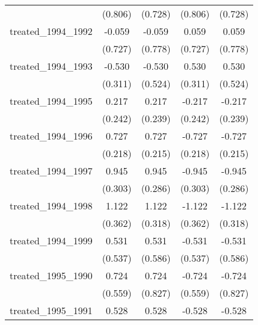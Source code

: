 {\begin{tabular}{l*{4}{c}}
            &     (0.806)         &     (0.728)         &     (0.806)         &     (0.728)         \\
[1em]
treated\_1994\_1992&      -0.059         &      -0.059         &       0.059         &       0.059         \\
            &     (0.727)         &     (0.778)         &     (0.727)         &     (0.778)         \\
[1em]
treated\_1994\_1993&      -0.530         &      -0.530         &       0.530         &       0.530         \\
            &     (0.311)         &     (0.524)         &     (0.311)         &     (0.524)         \\
[1em]
treated\_1994\_1995&       0.217         &       0.217         &      -0.217         &      -0.217         \\
            &     (0.242)         &     (0.239)         &     (0.242)         &     (0.239)         \\
[1em]
treated\_1994\_1996&       0.727\sym{***}&       0.727\sym{***}&      -0.727\sym{***}&      -0.727\sym{***}\\
            &     (0.218)         &     (0.215)         &     (0.218)         &     (0.215)         \\
[1em]
treated\_1994\_1997&       0.945\sym{**} &       0.945\sym{***}&      -0.945\sym{**} &      -0.945\sym{***}\\
            &     (0.303)         &     (0.286)         &     (0.303)         &     (0.286)         \\
[1em]
treated\_1994\_1998&       1.122\sym{**} &       1.122\sym{***}&      -1.122\sym{**} &      -1.122\sym{***}\\
            &     (0.362)         &     (0.318)         &     (0.362)         &     (0.318)         \\
[1em]
treated\_1994\_1999&       0.531         &       0.531         &      -0.531         &      -0.531         \\
            &     (0.537)         &     (0.586)         &     (0.537)         &     (0.586)         \\
[1em]
treated\_1995\_1990&       0.724         &       0.724         &      -0.724         &      -0.724         \\
            &     (0.559)         &     (0.827)         &     (0.559)         &     (0.827)         \\
[1em]
treated\_1995\_1991&       0.528         &       0.528         &      -0.528         &      -0.528         \\

\end{tabular}}
